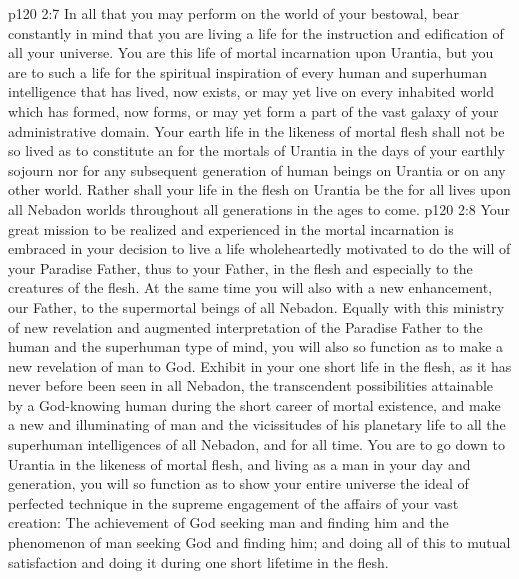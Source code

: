 \vs p120 2:7 \bibnobreakspace In all that you may perform on the world of your bestowal, bear constantly in mind that you are living a life for the instruction and edification of all your universe. You are  this life of mortal incarnation upon Urantia, but you are to  such a life for the spiritual inspiration of every human and superhuman intelligence that has lived, now exists, or may yet live on every inhabited world which has formed, now forms, or may yet form a part of the vast galaxy of your administrative domain. Your earth life in the likeness of mortal flesh shall not be so lived as to constitute an  for the mortals of Urantia in the days of your earthly sojourn nor for any subsequent generation of human beings on Urantia or on any other world. Rather shall your life in the flesh on Urantia be the  for all lives upon all Nebadon worlds throughout all generations in the ages to come.
\vs p120 2:8 \bibnobreakspace Your great mission to be realized and experienced in the mortal incarnation is embraced in your decision to live a life wholeheartedly motivated to do the will of your Paradise Father, thus to  your Father, in the flesh and especially to the creatures of the flesh. At the same time you will also  with a new enhancement, our Father, to the supermortal beings of all Nebadon. Equally with this ministry of new revelation and augmented interpretation of the Paradise Father to the human and the superhuman type of mind, you will also so function as to make a new revelation of man to God. Exhibit in your one short life in the flesh, as it has never before been seen in all Nebadon, the transcendent possibilities attainable by a God\hyp{}knowing human during the short career of mortal existence, and make a new and illuminating  of man and the vicissitudes of his planetary life to all the superhuman intelligences of all Nebadon, and for all time. You are to go down to Urantia in the likeness of mortal flesh, and living as a man in your day and generation, you will so function as to show your entire universe the ideal of perfected technique in the supreme engagement of the affairs of your vast creation: The achievement of God seeking man and finding him and the phenomenon of man seeking God and finding him; and doing all of this to mutual satisfaction and doing it during one short lifetime in the flesh.
